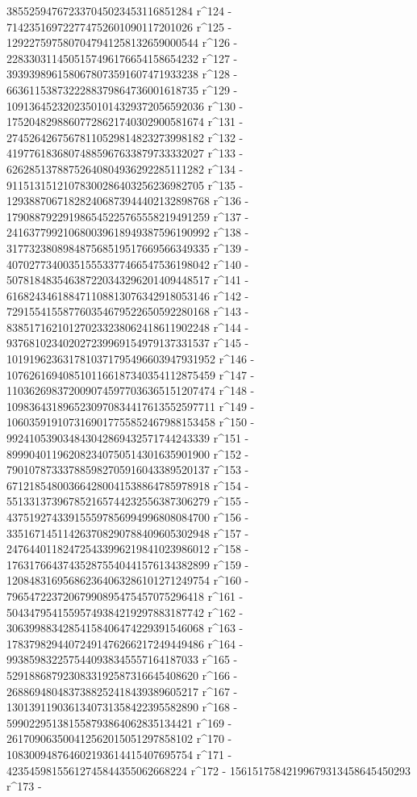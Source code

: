        385525947672337045023453116851284 r^124 - 
       714235169722774752601090117201026 r^125 - 
       1292275975807047941258132659000544 r^126 - 
       2283303114505157496176654158654232 r^127 - 
       3939398961580678073591607471933238 r^128 - 
       6636115387322288379864736001618735 r^129 - 
       10913645232023501014329372056592036 r^130 - 
       17520482988607728621740302900581674 r^131 - 
       27452642675678110529814823273998182 r^132 - 
       41977618368074885967633879733332027 r^133 - 
       62628513788752640804936292285111282 r^134 - 
       91151315121078300286403256236982705 r^135 - 
       129388706718282406873944402132898768 r^136 - 
       179088792291986545225765558219491259 r^137 - 
       241637799210680039618949387596190992 r^138 - 
       317732380898487568519517669566349335 r^139 - 
       407027734003515553377466547536198042 r^140 - 
       507818483546387220343296201409448517 r^141 - 
       616824346188471108813076342918053146 r^142 - 
       729155415587760354679522650592280168 r^143 - 
       838517162101270233238062418611902248 r^144 - 
       937681023402027239969154979137331537 r^145 - 
       1019196236317810371795496603947931952 r^146 - 
       1076261694085101166187340354112875459 r^147 - 
       1103626983720090745977036365151207474 r^148 - 
       1098364318965230970834417613552597711 r^149 - 
       1060359191073169017755852467988153458 r^150 - 
       992410539034843042869432571744243339 r^151 - 
       899904011962082340750514301635901900 r^152 - 
       790107873337885982705916043389520137 r^153 - 
       671218548003664280041538864785978918 r^154 - 
       551331373967852165744232556387306279 r^155 - 
       437519274339155597856994996808084700 r^156 - 
       335167145114263708290788409605302948 r^157 - 
       247644011824725433996219841023986012 r^158 - 
       176317664374352875540441576134382899 r^159 - 
       120848316956862364063286101271249754 r^160 - 
       79654722372067990895475457075296418 r^161 - 
       50434795415595749384219297883187742 r^162 - 
       30639988342854158406474229391546068 r^163 - 
       17837982944072491476266217249449486 r^164 - 
       9938598322575440938345557164187033 r^165 - 
       5291886879230833192587316645408620 r^166 - 
       2688694804837388252418439389605217 r^167 - 
       1301391190361340731358422395582890 r^168 - 
       599022951381558793864062835134421 r^169 - 
       261709063500412562015051297858102 r^170 - 
       108300948764602193614415407695754 r^171 - 
       42354598155612745844355062668224 r^172 - 
       15615175842199679313458645450293 r^173 - 
